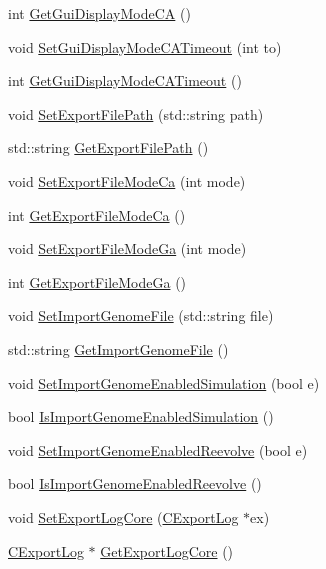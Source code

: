 \begin{DoxyCompactItemize}
\item 
int \hyperlink{classCConfigCore_af95425d2bb138a4daa6343ab3d8e0389}{GetGuiDisplayModeCA} ()
\item 
void \hyperlink{classCConfigCore_abf0b1f19353a1f0e205b1508754b6582}{SetGuiDisplayModeCATimeout} (int to)
\item 
int \hyperlink{classCConfigCore_ac7b29595aba0f65949b9dd6a4a069c92}{GetGuiDisplayModeCATimeout} ()
\item 
void \hyperlink{classCConfigCore_a22b33872f031fcd3e84c4b085dc5a70c}{SetExportFilePath} (std::string path)
\item 
std::string \hyperlink{classCConfigCore_a37d7199706fa48c52c534a96c9c33591}{GetExportFilePath} ()
\item 
void \hyperlink{classCConfigCore_ab7fb77f1f7774749c04e7d38eb67dbc3}{SetExportFileModeCa} (int mode)
\item 
int \hyperlink{classCConfigCore_a6f7e26303227176cb4a7204104e4a1cb}{GetExportFileModeCa} ()
\item 
void \hyperlink{classCConfigCore_a3f1c3a2faf6edc0f4e77c27d3c8326f3}{SetExportFileModeGa} (int mode)
\item 
int \hyperlink{classCConfigCore_a1537d3260c6d823348ab0edadb780f29}{GetExportFileModeGa} ()
\item 
void \hyperlink{classCConfigCore_a1a7590056fad40d5a2f0cdd2c241ae54}{SetImportGenomeFile} (std::string file)
\item 
std::string \hyperlink{classCConfigCore_a701fd27f77ab5e83d5e050a5bbaadc80}{GetImportGenomeFile} ()
\item 
void \hyperlink{classCConfigCore_a8b868c4f18c8d14fc6132dedce0de6dd}{SetImportGenomeEnabledSimulation} (bool e)
\item 
bool \hyperlink{classCConfigCore_ab5a548edaa135b5a3da90268f9473a9b}{IsImportGenomeEnabledSimulation} ()
\item 
void \hyperlink{classCConfigCore_ac73c74f5e53acd83f7b4272991abfe5e}{SetImportGenomeEnabledReevolve} (bool e)
\item 
bool \hyperlink{classCConfigCore_aac380fe0789216e072fc4cb33b8f0397}{IsImportGenomeEnabledReevolve} ()
\item 
void \hyperlink{classCConfigCore_ae001e63023359519bff27ff78ce4b5b1}{SetExportLogCore} (\hyperlink{classCExportLog}{CExportLog} $\ast$ex)
\item 
\hyperlink{classCExportLog}{CExportLog} $\ast$ \hyperlink{classCConfigCore_acefc129bafcc6fb8a22c901b74d0c65a}{GetExportLogCore} ()
\end{DoxyCompactItemize}
